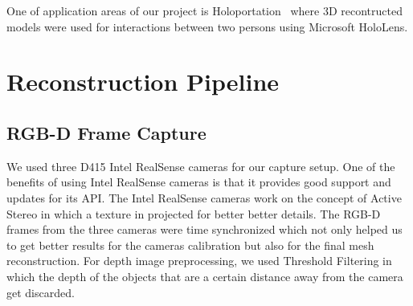 \documentclass[10pt,twocolumn,letterpaper]{article}
\begin{document}
One of application areas of our project is Holoportation~\cite{Authors7} where 3D recontructed models were used for interactions between two persons using Microsoft HoloLens.

\section{Reconstruction Pipeline}


\subsection{RGB-D Frame Capture}
We used three D415 Intel RealSense cameras for our capture setup. One of the benefits of using Intel RealSense cameras is that it provides good support and updates for its API. The Intel RealSense cameras work on the concept of Active Stereo in which a texture in projected for better better details. The RGB-D frames from the three cameras were time synchronized which not only helped us to get better results for the cameras calibration but also for the final mesh reconstruction. For depth image preprocessing, we used Threshold Filtering in which the depth of the objects that are a certain distance away from the camera get discarded.
\end{document}
